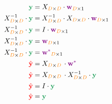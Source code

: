 \begin{equation}
\begin{aligned}
\mathbf{\mathcolor{ForestGreen}{y}}
&= X_{\mathcolor{orange}{D}\times\mathcolor{orange}{D}} \cdot \mathbf{\mathcolor{violet}{w}}_{\mathcolor{orange}{D}\times 1} \\
X_{\mathcolor{orange}{D}\times\mathcolor{orange}{D}}^{-1} \cdot \mathbf{\mathcolor{ForestGreen}{y}}
&= X_{\mathcolor{orange}{D}\times\mathcolor{orange}{D}}^{-1} \cdot
   X_{\mathcolor{orange}{D}\times\mathcolor{orange}{D}} \cdot
   \mathbf{\mathcolor{violet}{w}}_{\mathcolor{orange}{D}\times 1} \\
X_{\mathcolor{orange}{D}\times\mathcolor{orange}{D}}^{-1} \cdot \mathbf{\mathcolor{ForestGreen}{y}}
&= \mathit{I} \cdot \mathbf{\mathcolor{violet}{w}}_{\mathcolor{orange}{D}\times 1} \\
X_{\mathcolor{orange}{D}\times\mathcolor{orange}{D}}^{-1} \cdot \mathbf{\mathcolor{ForestGreen}{y}}
&= \mathbf{\mathcolor{violet}{w}}_{\mathcolor{orange}{D}\times 1}\\
X_{\mathcolor{orange}{D}\times\mathcolor{orange}{D}}^{-1} \cdot \mathbf{\mathcolor{ForestGreen}{y}}
&= \mathbf{\mathcolor{violet}{w}^{\mathcolor{violet}{*}}}_{\mathcolor{orange}{D} \times 1}\\
\mathcolor{red}{\hat{\mathbf{y}}} &= X_{\mathcolor{orange}{D}\times\mathcolor{orange}{D}} \, \cdot \mathcolor{violet}{\mathbf{w}}^{\mathcolor{violet}{*}}\\
\mathcolor{red}{\hat{\mathbf{y}}} &= X_{\mathcolor{orange}{D}\times\mathcolor{orange}{D}}\,\cdot X_{\mathcolor{orange}{D}\times\mathcolor{orange}{D}}^{-1} \cdot \mathbf{\mathcolor{ForestGreen}{y}}\\
\mathcolor{red}{\hat{\mathbf{y}}} &= I \cdot \mathbf{\mathcolor{ForestGreen}{y}}\\
\mathcolor{red}{\hat{\mathbf{y}}} &= \mathbf{\mathcolor{ForestGreen}{y}}
\end{aligned}
\end{equation}
